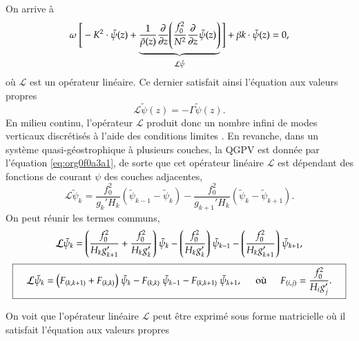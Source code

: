 \documentclass{article}
\numberwithin{equation}{section}
\newcommand{\tpsi}{\tilde{\psi}}
\begin{document}
On arrive à
\begin{equation}
\label{eq:org0b2ff9f}
\omega\ \Bigg[ - K^2 \cdot \tpsi(z) + \underbrace{\frac{1}{\tilde{\rho}(z)}\pdv{z}\qty(\frac{f_0^2}{N^2} \pdv{z}\tpsi(z))}_{\mathcal{L}\tpsi} \Bigg] + \beta k\cdot \tpsi(z) = 0,
\end{equation}
où \(\mathcal{L}\) est un opérateur linéaire.
Ce dernier satisfait ainsi l'équation aux valeurs propres
\begin{equation}
\mathcal{L}\tpsi(z) = - \Gamma \tpsi(z).
\end{equation}
En milieu continu, l'opérateur \(\mathcal{L}\) produit donc un nombre infini de modes verticaux discrétisés à l'aide des conditions limites \cite[p.468]{vallis_2006}.
En revanche, dans un système quasi-géostrophique à plusieurs couches, la QGPV est donnée par l'équation \ref{eq:org0f0a3a1}, de sorte que cet opérateur linéaire \(\mathcal{L}\) est dépendant des fonctions de courant \(\psi\) des couches adjacentes,
\begin{equation}
\mathcal{L}\tpsi_k = \frac{f_0^2}{g_k' H_k} (\tpsi_{k-1} - \tpsi_k) - \frac{f_0^2}{g_{k+1}'H_k} (\tpsi_k - \tpsi_{k+1}).
\end{equation}
On peut réunir les termes communs,
\begin{align}
\mathcal{L} \tpsi_k = \qty( \frac{f_0^2}{H_k g'_{k+1}} + \frac{f_0^2}{H_k g'_{k}} )\ \tpsi_k
- \qty(\frac{f_0^2}{H_k g'_{k}})\ \tpsi_{k-1}
- \qty(\frac{f_0^2}{H_k g'_{k+1}})\ \tpsi_{k+1},\nonumber
\end{align}
\begin{equation}
\boxed{\hspace{0.4cm}
\mathcal{L}\tpsi_k = \qty( F_{(k,k+1)} + F_{(k,k)}) \ \tpsi_k
- F_{(k,k)}\ \tpsi_{k-1}
- F_{(k,k+1)}\ \tpsi_{k+1},
\hspace{0.5cm}\text{où}\hspace{0.5cm}
F_{(i,j)} = \frac{f_0^2}{H_i g'_j}.
\hspace{0.4cm} }
\end{equation}

On voit que l'opérateur linéaire \(\mathcal{L}\) peut être exprimé sous forme matricielle où il satisfait l'équation aux valeurs propres
\end{document}
